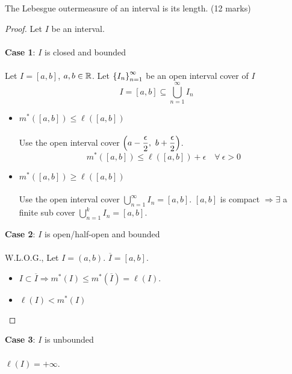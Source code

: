 \documentclass[a4paper]{book}
\begin{document}
\begin{theorem}
The Lebesgue outermeasure of an interval is its length. \hfill(12 marks)
\begin{proof}
Let $I$ be an interval. \\\\
{\bf Case 1}: $I$ is closed and bounded \\\\
Let $I = [a,b]$, $a,b \in \mathbb{R}$. Let $\qty{I_n}_{n=1}^{\infty}$ be an open interval cover of $I$
\[ I = [a,b] \subseteq \bigcup_{n=1}^\infty I_n\]
\begin{itemize}
\item \claim $m^*([a,b]) \leq \ell([a,b])$ \\\\
Use the open interval cover $\qty(a- \dfrac{\epsilon}{2},\ b+\dfrac{\epsilon}{2} )$. \[m^*([a,b]) \leq \ell([a,b]) + \epsilon \quad \forall\ \epsilon>0\]
\item \claim $m^*([a,b]) \geq \ell([a,b])$ \\\\
Use the open interval cover $\displaystyle \bigcup_{n=1}^\infty I_n = [a,b]$. $[a,b]$ is compact $\Rightarrow \exists$ a finite sub cover $\displaystyle \bigcup_{n=1}^k I_n = [a,b]$.
\end{itemize}
{\bf Case 2}: $I$ is open/half-open and bounded \\\\
W.L.O.G., Let $I = (a,b)$. $\overline{I} = [a,b]$.
\begin{itemize}
\item $I \subset \overline{I} \Longrightarrow m^*(I) \leq m^*(\overline{I}) = \ell(I)$.
\item $\ell(I)<m^*(I)$
\end{itemize}
\end{proof}
{\bf Case 3}: $I$ is unbounded \\\\
$\ell(I) = +\infty$. 
\end{theorem}



\end{document}
